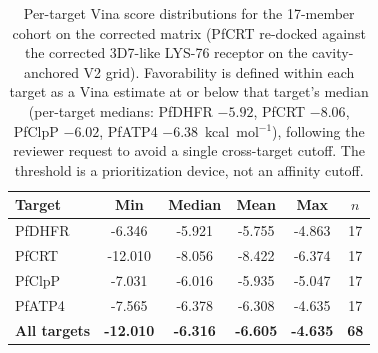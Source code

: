 \begin{table}[htbp]
\centering
\caption{Per-target Vina score distributions for the 17-member cohort on the corrected matrix (PfCRT re-docked against the corrected 3D7-like LYS-76 receptor on the cavity-anchored V2 grid). Favorability is defined within each target as a Vina estimate at or below that target's median (per-target medians: PfDHFR $-5.92$, PfCRT $-8.06$, PfClpP $-6.02$, PfATP4 $-6.38$~kcal~mol$^{-1}$), following the reviewer request to avoid a single cross-target cutoff. The threshold is a prioritization device, not an affinity cutoff.}
\label{tab:sm_vina_distributions}
\small
\begin{tabular}{l S[table-format=-1.3] S[table-format=-1.3] S[table-format=-1.3] S[table-format=-1.3] S[table-format=2.0]}
\toprule
Target & {Min} & {Median} & {Mean} & {Max} & {$n$} \\
\midrule
PfDHFR  & -6.346 & -5.921 & -5.755 & -4.863 & 17 \\
PfCRT   & -12.010 & -8.056 & -8.422 & -6.374 & 17 \\
PfClpP  & -7.031 & -6.016 & -5.935 & -5.047 & 17 \\
PfATP4  & -7.565 & -6.378 & -6.308 & -4.635 & 17 \\
\midrule
\textbf{All targets} & \textbf{-12.010} & \textbf{-6.316} & \textbf{-6.605} & \textbf{-4.635} & \textbf{68} \\
\bottomrule
\end{tabular}
\end{table}